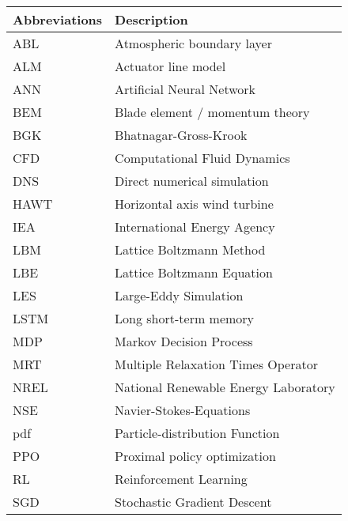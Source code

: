 \begin{longtable}{p{7cm}p{7cm}}
	Abbreviations	& Description\\ \hline
	ABL				& Atmospheric boundary layer \\
	ALM				& Actuator line model \\
	ANN				& Artificial Neural Network \\
	BEM				& Blade element / momentum theory \\
	BGK        		& Bhatnagar-Gross-Krook \\
	CFD				& Computational Fluid Dynamics \\
	DNS         	& Direct numerical simulation \\
	HAWT			& Horizontal axis wind turbine \\
	IEA				& International Energy Agency \\
	LBM         	& Lattice Boltzmann Method \\
	LBE         	& Lattice Boltzmann Equation \\
	LES         	& Large-Eddy Simulation \\
	LSTM			& Long short-term memory \\
	MDP				& Markov Decision Process \\
	MRT         	& Multiple Relaxation Times Operator \\
	NREL			& National Renewable Energy Laboratory \\
	NSE         	& Navier-Stokes-Equations \\
	pdf         	& Particle-distribution Function \\
	PPO				& Proximal policy optimization \\
	RL				& Reinforcement Learning \\
	SGD				& Stochastic Gradient Descent 
\end{longtable}
